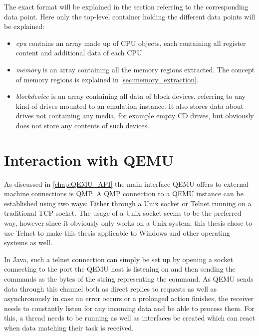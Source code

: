 The exact format will be explained in the section referring to the corresponding data point.
Here only the top-level container holding the different data points will be explained:
\begin{itemize}
    \item \emph{cpu} contains an array made up of CPU objects, each containing all register content and additional data of each CPU.
    \item \emph{memory} is an array containing all the memory regions extracted.
    The concept of memory regions is explained in \autoref{sec:memory_extraction}.
    \item \emph{blockdevice} is an array containing all data of block devices,
    referring to any kind of drives mounted to an emulation instance.
    It also stores data about drives not containing any media, for example empty CD drives,
    but obviously does not store any contents of such devices.
\end{itemize}

\section{Interaction with QEMU}\label{sec:QEMU_Interaction}
As discussed in \autoref{chap:QEMU_API} the main interface QEMU offers to external machine connections is QMP.
A QMP connection to a QEMU instance can be established using two ways:
Either through a Unix socket or Telnet running on a traditional TCP socket.
The usage of a Unix socket seems to be the preferred way,
however since it obviously only works on a Unix system,
this thesis chose to use Telnet to make this thesis applicable
to Windows and other operating systems as well.

In Java, such a telnet connection can simply be set up by opening a socket connecting to the port the QEMU host is listening on
and then sending the commands as the bytes of the string representing the command.
As QEMU sends data through this channel both as direct replies to requests as well as asynchronously
in case an error occurs or a prolonged action finishes,
the receiver needs to constantly listen for any incoming data and be able to process them.
For this, a thread needs to be running as well as interfaces be created
which can react when data matching their task is received.

